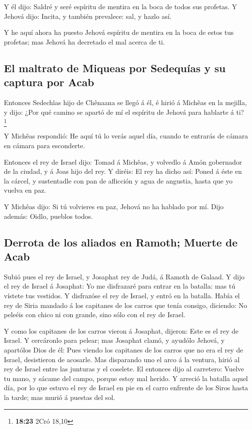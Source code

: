  Y él dijo: Saldré y seré espíritu de mentira en la boca de
todos sus profetas. Y Jehová dijo: Incita, y también prevalece: sal, y
hazlo así.

 Y he aquí ahora ha puesto Jehová espíritu de mentira en la
boca de estos tus profetas; mas Jehová ha decretado el mal acerca de ti.

\hypertarget{el-maltrato-de-miqueas-por-sedequuxedas-y-su-captura-por-acab}{%
\subsection{El maltrato de Miqueas por Sedequías y su captura por
Acab}\label{el-maltrato-de-miqueas-por-sedequuxedas-y-su-captura-por-acab}}

 Entonces Sedechîas hijo de Chênaana se llegó á él, é hirió
á Michêas en la mejilla, y dijo: ¿Por qué camino se apartó de mí el
espíritu de Jehová para hablarte á ti? \footnote{\textbf{18:23} 2Cró
  18,10}

 Y Michêas respondió: He aquí tú lo verás aquel día, cuando
te entrarás de cámara en cámara para esconderte.

 Entonces el rey de Israel dijo: Tomad á Michêas, y
volvedlo á Amón gobernador de la ciudad, y á Joas hijo del rey.
 Y diréis: El rey ha dicho así: Poned á éste en la cárcel,
y sustentadle con pan de aflicción y agua de angustia, hasta que yo
vuelva en paz.

 Y Michêas dijo: Si tú volvieres en paz, Jehová no ha
hablado por mí. Dijo además: Oidlo, pueblos todos.

\hypertarget{derrota-de-los-aliados-en-ramoth-muerte-de-acab}{%
\subsection{Derrota de los aliados en Ramoth; Muerte de
Acab}\label{derrota-de-los-aliados-en-ramoth-muerte-de-acab}}

 Subió pues el rey de Israel, y Josaphat rey de Judá, á
Ramoth de Galaad.  Y dijo el rey de Israel á Josaphat: Yo
me disfrazaré para entrar en la batalla: mas tú vístete tus vestidos. Y
disfrazóse el rey de Israel, y entró en la batalla.  Había
el rey de Siria mandado á los capitanes de los carros que tenía consigo,
diciendo: No peleéis con chico ni con grande, sino sólo con el rey de
Israel.

 Y como los capitanes de los carros vieron á Josaphat,
dijeron: Este es el rey de Israel. Y cercáronlo para pelear; mas
Josaphat clamó, y ayudólo Jehová, y apartólos Dios de él: 
Pues viendo los capitanes de los carros que no era el rey de Israel,
desistieron de acosarle.  Mas disparando uno el arco á la
ventura, hirió al rey de Israel entre las junturas y el coselete. El
entonces dijo al carretero: Vuelve tu mano, y sácame del campo, porque
estoy mal herido.  Y arreció la batalla aquel día, por lo
que estuvo el rey de Israel en pie en el carro enfrente de los Siros
hasta la tarde; mas murió á puestas del sol.


